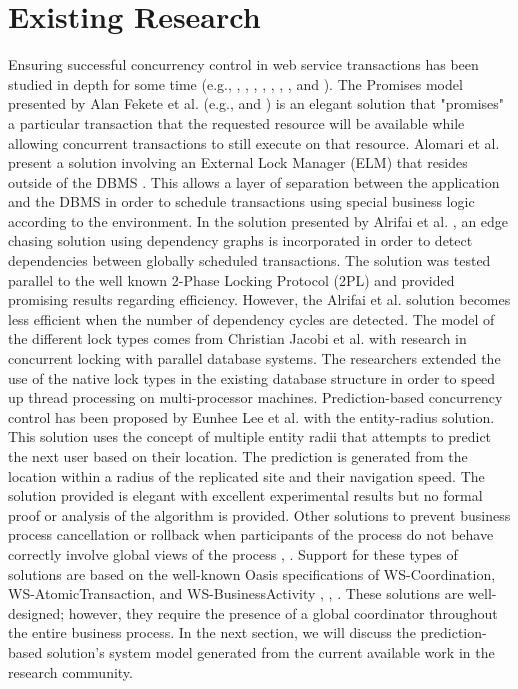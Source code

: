 \section{Existing Research}
\label{sec:existing_research}
Ensuring successful concurrency control in web service transactions has been studied in depth for some time (e.g., \cite{Fekete_Promises}, \cite{Fekete_IsolationSupport}, \cite{Alrifai_Distributed_Managment}, \cite{dai_qos-driven_2009}, \cite{zhengdong_gao_combining_2005}, \cite{ferreira_transactional_2012}, \cite{kang-woo_lee_consistency_2000}, and \cite{olmsted_long_2015}). The Promises model presented by Alan Fekete et al. (e.g., \cite{Fekete_Promises} and \cite{Fekete_IsolationSupport}) is an elegant solution that "promises" a particular transaction that the requested resource will be available while allowing concurrent transactions to still execute on that resource. Alomari et al. present a solution involving an External Lock Manager (ELM) that resides outside of the DBMS \cite{Fekete_SnapshotIso}. This allows a layer of separation between the application and the DBMS in order to schedule transactions using special business logic according to the environment. In the solution presented by Alrifai et al. \cite{Alrifai_Distributed_Managment}, an edge chasing solution using dependency graphs is incorporated in order to detect dependencies between globally scheduled transactions. The solution was tested parallel to the well known 2-Phase Locking Protocol (2PL) and provided promising results regarding efficiency. However, the Alrifai et al. solution becomes less efficient when the number of dependency cycles are detected. The model of the different lock types comes from Christian Jacobi et al. \cite{Jacobi_Locking} with research in concurrent locking with parallel database systems. The researchers extended the use of the native lock types in the existing database structure in order to speed up thread processing on multi-processor machines. Prediction-based concurrency control has been proposed by Eunhee Lee et al. \cite{Eunhee_PredictionBasedCC} with the entity-radius solution. This solution uses the concept of multiple entity radii that attempts to predict the next user based on their location. The prediction is generated from the location within a radius of the replicated site and their navigation speed. The solution provided is elegant with excellent experimental results but no formal proof or analysis of the algorithm is provided. Other solutions to prevent business process cancellation or rollback when participants of the process do not behave correctly involve global views of the process \cite{Fekete_RAMP}, \cite{Riegen_RuleBased}. Support for these types of solutions are based on the well-known Oasis specifications of WS-Coordination, WS-AtomicTransaction, and WS-BusinessActivity \cite{WSCO}, \cite{WSAT}, \cite{WSBA}. These solutions are well-designed; however, they require the presence of a global coordinator throughout the entire business process. In the next section, we will discuss the prediction-based solution's system model generated from the current available work in the research community.